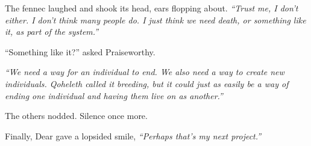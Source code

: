 The fennec laughed and shook its head, ears flopping about. \emph{``Trust me, I don't either. I don't think many people do. I just think we need death, or something like it, as part of the system.''}

``Something like it?'' asked Praiseworthy.

\emph{``We need a way for an individual to end. We also need a way to create new individuals. Qoheleth called it breeding, but it could just as easily be a way of ending one individual and having them live on as another.''}

The others nodded. Silence once more.

Finally, Dear gave a lopsided smile, \emph{``Perhaps that's my next project.''}
